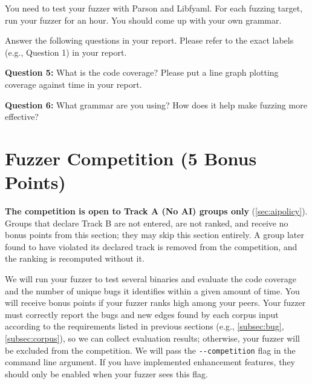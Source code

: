 \documentclass[letterpaper,11pt]{article}
\begin{document}
You need to test your fuzzer with Parson and Libfyaml.
For each fuzzing target, run your fuzzer for an hour.
You should come up with your own grammar.

Answer the following questions in your report. Please refer to the exact labels (e.g., Question 1) in your report.

\textbf{Question 5:}
What is the code coverage? Please put a line graph plotting coverage against time in your report.

\textbf{Question 6:}
What grammar are you using? How does it help make fuzzing more effective?



\section{Fuzzer Competition (5 Bonus Points)}
\label{sec:fuzzercompetition}


\textbf{The competition is open to Track A (No AI) groups only}
(\autoref{sec:aipolicy}). Groups that declare Track B are not entered, are not
ranked, and receive no bonus points from this section; they may skip this
section entirely. A group later found to have violated its declared track is
removed from the competition, and the ranking is recomputed without it.

We will run your fuzzer to test several binaries and evaluate the code coverage and the number of unique bugs it identifies within a given amount of time.
You will receive bonus points if your fuzzer ranks high among your peers.
Your fuzzer must correctly report the bugs and new edges found by each corpus input according to the requirements listed in previous sections (e.g., \autoref{subsec:bug}, \autoref{subsec:corpus}), so we can collect evaluation results;
otherwise, your fuzzer will be excluded from the competition.
We will pass the \texttt{{-}{-}competition} flag in the command line argument.
If you have implemented enhancement features, they should only be enabled when your fuzzer sees this flag.
\end{document}
